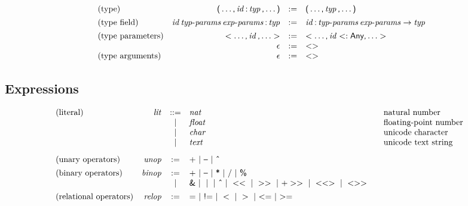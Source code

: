 $$
\begin{array}{@{}lrcl@{}}
\text{(type)} &
\K( \dots \K, \x{id} \K: \x{typ} \K, \dots \K) &:=&
  \K( \dots \K, \x{typ} \K, \dots \K) \\
[1ex]
\text{(type field)} &
\x{id} \x{typ-params} \x{exp-params} \K: \x{typ} &:=&
  \x{id} \K: \x{typ-params} \x{exp-params} \Kto \x{typ} \\
[1ex]
\text{(type parameters)} &
\Klt \dots \K, \x{id} \K, \dots \Kgt &:=&
  \Klt \dots \K, \x{id} \Ksub \K{Any} \K, \dots \Kgt \\&
\epsilon &:=&
  \Klt \Kgt \\
\text{(type arguments)} &
\epsilon &:=&
  \Klt \Kgt \\
\end{array}
$$


\subsection*{Expressions}

$$
\begin{array}{@{}lrcl@{\qquad}l}
\text{(literal)} & \x{lit} &::=&
  \x{nat}
    & \text{natural number} \\&&|&
  \x{float}
    & \text{floating-point number} \\&&|&
  \x{char}
    & \text{unicode character} \\&&|&
  \x{text}
    & \text{unicode text string} \\
[2ex]
\text{(unary operators)} & \x{unop} &:=&
  \K{+} ~|~ \K\textendash ~|~ \K{\^{}} \\
[1ex]
\text{(binary operators)} & \x{binop} &:=&
  \K{+} ~|~ \K\textendash ~|~ \K{*} ~|~ \K{/} ~|~ \K{\%} \\&&|&
  \K{\&} ~|~ \;\K\textbar\; ~|~ \K{\^{}} ~|~ \Klt\Klt ~|~ \Kgt\Kgt ~|~ \K{+}\Kgt\Kgt ~|~ \Klt\Klt\Kgt ~|~ \Klt\Kgt\Kgt \\
[1ex]
\text{(relational operators)} & \x{relop} &:=&
  \K= ~|~ \K{!=} ~|~ \Klt ~|~ \Kgt ~|~ {\Klt}{\K=} ~|~ {\Kgt}{\K=} \\
\end{array}
$$

